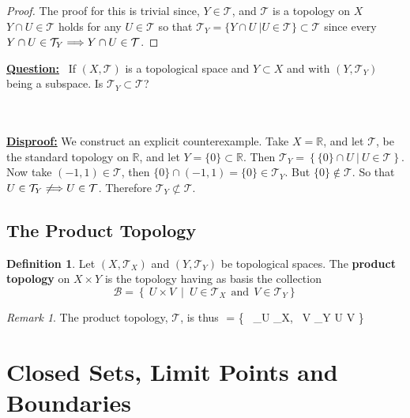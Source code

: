 \documentclass{article}
\theoremstyle{remark}
\newtheorem*{remark}{Remark}
\theoremstyle{definition}
\newtheorem{definition}{Definition}[section]
\newcommand{\simplies}{\DOTSB\Longrightarrow}
\begin{document}
\begin{proof}
The proof for this is trivial since, $Y \in \mathcal{T}$, and $\mathcal{T}$ is a topology on $X$ $Y \cap U \in \mathcal{T}$ holds for any $U \in \mathcal{T}$ so that $\mathcal{T}_Y = \{ Y \cap U \ | U \in \mathcal{T}\} \subset \mathcal{T}$ since every $Y \cap U \in  \mathcal{T}_Y \simplies Y \cap U \in  \mathcal{T}$.
\end{proof}

\smallskip \begin{flushleft}
\textbf{\underline{Question:}} \ If $(X, \mathcal{T})$ is a topological space and $Y \subset X$ and with $(Y, \mathcal{T}_Y)$ being a subspace. Is $\mathcal{T}_Y \subset \mathcal{T}$?
\end{flushleft}
\\ \\
\textbf{\underline{Disproof:}} We construct an explicit counterexample. Take $X = \mathbb{R}$, and let $\mathcal{T}$, be the standard topology on $\mathbb{R}$, and let $Y = \{0\} \subset \mathbb{R}$. Then $\mathcal{T}_Y = \left\{ \{0\} \cap U \ | \ U \in \mathcal{T} \right\}$. Now take $(-1, 1) \in \mathcal{T}$, then $\{0\} \cap (-1, 1) = \{0\} \in \mathcal{T}_Y$. But $\{0\} \not\in \mathcal{T}$. So that $U \in \mathcal{T}_Y \not\simplies U \in \mathcal{T}$. Therefore $\mathcal{T}_Y \not\subset \mathcal{T}.$


\bigskip
\subsection{The Product Topology}

\begin{definition}
Let $(X, \mathcal{T}_X)$ and $(Y, \mathcal{T}_Y)$ be topological spaces. The \textbf{product topology} on $X \times Y$ is the topology having as basis the collection $$\mathcal{B} = \left\{ \ U \times V \ \middle| \ U \in \mathcal{T}_X \ \ \text{and} \ \ V \in \mathcal{T}_Y\right\}$$
\end{definition}

\begin{remark}
The product topology, $\mathcal{T}$, is thus $$ = \left\{ \ \bigcup_{U \in {}_X, \ V \in {}_Y} U \times V \right\}
\end{remark}
\newpage

\section{Closed Sets, Limit Points and Boundaries}
\end{document}
